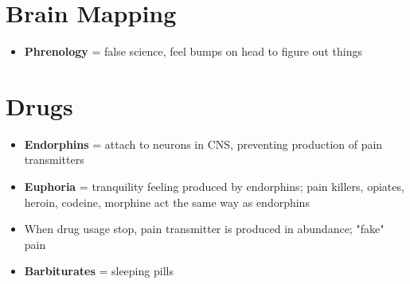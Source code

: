 \documentclass[a4paper,12pt]{article}
\begin{document}
\section{Brain Mapping}
\begin{itemize}
    \item{\textbf{Phrenology} = false science, feel bumps on head to figure out things}
\end{itemize}

\section{Drugs}
\begin{itemize}
    \item{\textbf{Endorphins} = attach to neurons in CNS, preventing production of pain transmitters}
    \item{\textbf{Euphoria} = tranquility feeling produced by endorphins; pain killers, opiates, heroin, codeine, morphine act the same way as endorphins}
    \item{When drug usage stop, pain transmitter is produced in abundance; "fake" pain}
    \item{\textbf{Barbiturates} = sleeping pills}
\end{itemize}
\end{document}
